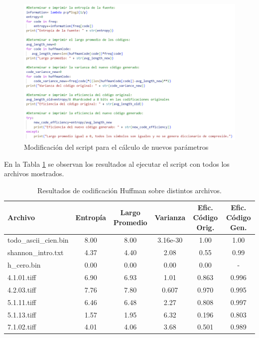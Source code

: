 \documentclass[conference,onecolumn,12pt]{IEEEtran}
\numberwithin{equation}{subsection}
\begin{document}
\begin{figure}[!h]
    \begin{center}
        \includegraphics[width=0.9\linewidth]{figures/modscript.png}
        \caption{Modificación del script para el cálculo de nuevos parámetros}
        \label{fig:modscript}
    \end{center}
\end{figure}

En la Tabla \ref{tab:huffman_resultados} se observan los resultados al ejecutar el script con todos los archivos mostrados.

\hfill\break \hfill\break \hfill\break \hfill\break \hfill\break
\hfill\break 


 \begin{table}[h!]
    \centering
    \caption{Resultados de codificación Huffman sobre distintos archivos.}
    \label{tab:huffman_resultados}
    \begin{tabular}{lccccc}
    \toprule
    \textbf{Archivo} & \textbf{Entropía} & \textbf{Largo Promedio} & \textbf{Varianza} & \textbf{Efic. Código Orig.} & \textbf{Efic. Código Gen.} \\
    \midrule
    todo\_ascii\_cien.bin & 8.00 & 8.00 & 3.16e-30 & 1.00 & 1.00 \\
    shannon\_intro.txt & 4.37 & 4.40 & 2.08 & 0.55 & 0.99 \\
    h\_cero.bin & 0.00 & 0.00 & 0.00 & 0.00 & - \\
    4.1.01.tiff & 6.90 & 6.93 & 1.01 & 0.863 & 0.996 \\
    4.2.03.tiff & 7.76 & 7.80 & 0.607 & 0.970 & 0.995 \\
    5.1.11.tiff & 6.46 & 6.48 & 2.27 & 0.808 & 0.997 \\
    5.1.13.tiff & 1.57 & 1.95 & 6.32 & 0.196 & 0.803 \\
    7.1.02.tiff & 4.01 & 4.06 & 3.68 & 0.501 & 0.989 \\
    \bottomrule
    \end{tabular}
\end{table}
\end{document}
